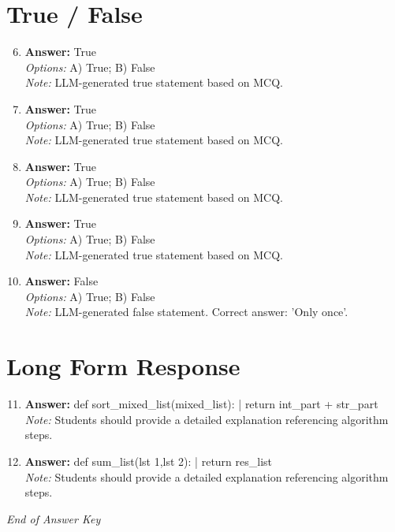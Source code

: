 \documentclass[12pt]{article}
\begin{document}
\section*{True / False}
\begin{enumerate}[label=\arabic*.]
\setcounter{enumi}{5}
\item \textbf{Answer:} True
\\ \textit{Options:} A) True; B) False
\\ \textit{Note:} LLM-generated true statement based on MCQ.
\item \textbf{Answer:} True
\\ \textit{Options:} A) True; B) False
\\ \textit{Note:} LLM-generated true statement based on MCQ.
\item \textbf{Answer:} True
\\ \textit{Options:} A) True; B) False
\\ \textit{Note:} LLM-generated true statement based on MCQ.
\item \textbf{Answer:} True
\\ \textit{Options:} A) True; B) False
\\ \textit{Note:} LLM-generated true statement based on MCQ.
\item \textbf{Answer:} False
\\ \textit{Options:} A) True; B) False
\\ \textit{Note:} LLM-generated false statement. Correct answer: 'Only once'.
\end{enumerate}

\section*{Long Form Response}
\begin{enumerate}[label=\arabic*.]
\setcounter{enumi}{10}
\item \textbf{Answer:} def sort\_mixed\_list(mixed\_list): | return int\_part + str\_part
\\ \textit{Note:} Students should provide a detailed explanation referencing algorithm steps.
\item \textbf{Answer:} def sum\_list(lst 1,lst 2): | return res\_list
\\ \textit{Note:} Students should provide a detailed explanation referencing algorithm steps.
\end{enumerate}

\vfill
\noindent\textit{End of Answer Key}
\end{document}
